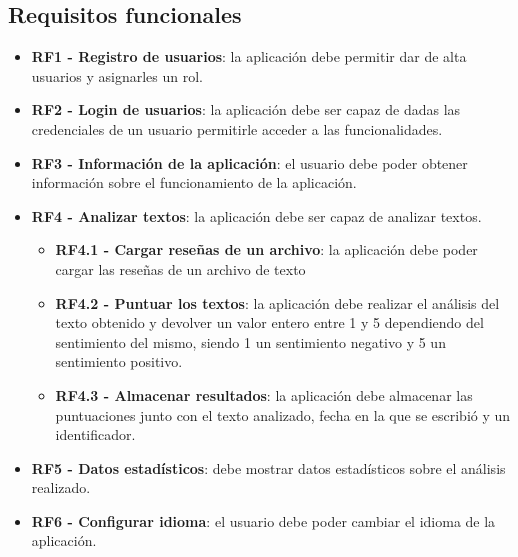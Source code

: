 \subsection{Requisitos funcionales}
\begin{itemize}
	\tightlist
	\item \textbf{RF1 - Registro de usuarios}: la aplicación debe permitir dar de alta usuarios y asignarles un rol.
	\item \textbf{RF2 - Login de usuarios}: la aplicación debe ser capaz de dadas las credenciales de un usuario permitirle acceder a las funcionalidades. 
	\item \textbf{RF3 - Información de la aplicación}: el usuario debe poder obtener información sobre el funcionamiento de la aplicación. 
	\item \textbf{RF4 - Analizar textos}: la aplicación debe ser capaz de analizar textos.
	\begin{itemize}
		\item \textbf{RF4.1 - Cargar reseñas de un archivo}: la aplicación debe poder cargar las reseñas de un archivo de texto
		\item \textbf{RF4.2 - Puntuar los textos}: la aplicación debe realizar el análisis del texto obtenido y devolver un valor entero entre 1 y 5 dependiendo del sentimiento del mismo, siendo 1 un sentimiento negativo y 5 un sentimiento positivo.     
		\item \textbf{RF4.3 - Almacenar resultados}: la aplicación debe almacenar las puntuaciones junto con el texto analizado, fecha en la que se escribió y un identificador. 
	\end{itemize}
	\item \textbf{RF5 - Datos estadísticos}: debe mostrar datos estadísticos sobre el análisis realizado.
	\item \textbf{RF6 - Configurar idioma}: el usuario debe poder cambiar el idioma de la aplicación. 
\end{itemize}      
